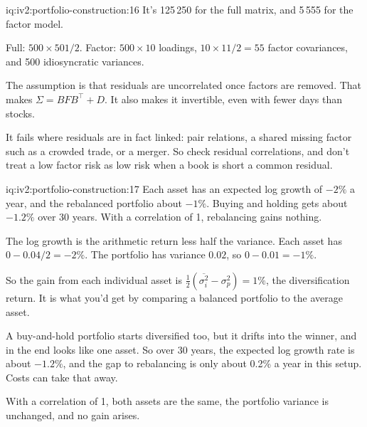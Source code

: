 \begin{solution}{iq:iv2:portfolio-construction:16}
It's 125\,250 for the full matrix, and 5\,555 for the factor model.

Full: $500 \times 501/2$. Factor: $500 \times 10$ loadings, $10 \times 11/2 = 55$ factor covariances, and 500 idiosyncratic variances.

The assumption is that residuals are uncorrelated once factors are removed. That makes $\Sigma = BFB^\top + D$. It also makes it invertible, even with fewer days than stocks.

It fails where residuals are in fact linked: pair relations, a shared missing factor such as a crowded trade, or a merger. So check residual correlations, and don't treat a low factor risk as low risk when a book is short a common residual.

\end{solution}

\begin{solution}{iq:iv2:portfolio-construction:17}
Each asset has an expected log growth of $-2\%$ a year, and the rebalanced portfolio about $-1\%$. Buying and holding gets about $-1.2\%$ over 30 years. With a correlation of 1, rebalancing gains nothing.

The log growth is the arithmetic return less half the variance. Each asset has $0 - 0.04/2 = -2\%$. The portfolio has variance $0.02$, so $0 - 0.01 = -1\%$.

So the gain from each individual asset is $\tfrac12(\overline{\sigma_i^2} - \sigma_p^2) = 1\%$, the diversification return. It is what you'd get by comparing a balanced portfolio to the average asset.

A buy-and-hold portfolio starts diversified too, but it drifts into the winner, and in the end looks like one asset. So over 30 years, the expected log growth rate is about $-1.2\%$, and the gap to rebalancing is only about 0.2\% a year in this setup. Costs can take that away.

With a correlation of 1, both assets are the same, the portfolio variance is unchanged, and no gain arises.

\end{solution}

